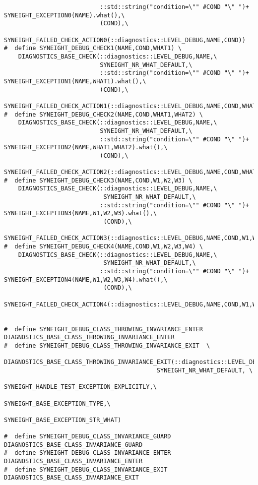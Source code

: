 \begin{verbatim}
                           ::std::string("condition=\"" #COND "\" ")+ SYNEIGHT_EXCEPTION0(NAME).what(),\
                           (COND),\
                           SYNEIGHT_FAILED_CHECK_ACTION0(::diagnostics::LEVEL_DEBUG,NAME,COND))
#  define SYNEIGHT_DEBUG_CHECK1(NAME,COND,WHAT1) \
    DIAGNOSTICS_BASE_CHECK(::diagnostics::LEVEL_DEBUG,NAME,\
                           SYNEIGHT_NR_WHAT_DEFAULT,\
                           ::std::string("condition=\"" #COND "\" ")+ SYNEIGHT_EXCEPTION1(NAME,WHAT1).what(),\
                           (COND),\
                           SYNEIGHT_FAILED_CHECK_ACTION1(::diagnostics::LEVEL_DEBUG,NAME,COND,WHAT1))
#  define SYNEIGHT_DEBUG_CHECK2(NAME,COND,WHAT1,WHAT2) \
    DIAGNOSTICS_BASE_CHECK(::diagnostics::LEVEL_DEBUG,NAME,\
                           SYNEIGHT_NR_WHAT_DEFAULT,\
                           ::std::string("condition=\"" #COND "\" ")+ SYNEIGHT_EXCEPTION2(NAME,WHAT1,WHAT2).what(),\
                           (COND),\
                           SYNEIGHT_FAILED_CHECK_ACTION2(::diagnostics::LEVEL_DEBUG,NAME,COND,WHAT1,WHAT2))
#  define SYNEIGHT_DEBUG_CHECK3(NAME,COND,W1,W2,W3) \
    DIAGNOSTICS_BASE_CHECK(::diagnostics::LEVEL_DEBUG,NAME,\
                            SYNEIGHT_NR_WHAT_DEFAULT,\
                           ::std::string("condition=\"" #COND "\" ")+ SYNEIGHT_EXCEPTION3(NAME,W1,W2,W3).what(),\
                            (COND),\
                            SYNEIGHT_FAILED_CHECK_ACTION3(::diagnostics::LEVEL_DEBUG,NAME,COND,W1,W2,W3))
#  define SYNEIGHT_DEBUG_CHECK4(NAME,COND,W1,W2,W3,W4) \
    DIAGNOSTICS_BASE_CHECK(::diagnostics::LEVEL_DEBUG,NAME,\
                            SYNEIGHT_NR_WHAT_DEFAULT,\
                           ::std::string("condition=\"" #COND "\" ")+ SYNEIGHT_EXCEPTION4(NAME,W1,W2,W3,W4).what(),\
                            (COND),\
                            SYNEIGHT_FAILED_CHECK_ACTION4(::diagnostics::LEVEL_DEBUG,NAME,COND,W1,W2,W3,W4))


#  define SYNEIGHT_DEBUG_CLASS_THROWING_INVARIANCE_ENTER DIAGNOSTICS_BASE_CLASS_THROWING_INVARIANCE_ENTER
#  define SYNEIGHT_DEBUG_CLASS_THROWING_INVARIANCE_EXIT  \
    DIAGNOSTICS_BASE_CLASS_THROWING_INVARIANCE_EXIT(::diagnostics::LEVEL_DEBUG,\
                                           SYNEIGHT_NR_WHAT_DEFAULT, \
                                           SYNEIGHT_HANDLE_TEST_EXCEPTION_EXPLICITLY,\
                                           SYNEIGHT_BASE_EXCEPTION_TYPE,\
                                           SYNEIGHT_BASE_EXCEPTION_STR_WHAT)

#  define SYNEIGHT_DEBUG_CLASS_INVARIANCE_GUARD DIAGNOSTICS_BASE_CLASS_INVARIANCE_GUARD
#  define SYNEIGHT_DEBUG_CLASS_INVARIANCE_ENTER DIAGNOSTICS_BASE_CLASS_INVARIANCE_ENTER
#  define SYNEIGHT_DEBUG_CLASS_INVARIANCE_EXIT  DIAGNOSTICS_BASE_CLASS_INVARIANCE_EXIT


\end{verbatim}
